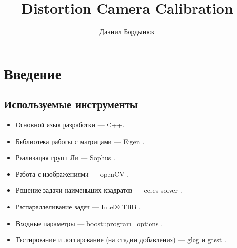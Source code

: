 


\title{Distortion Camera Calibration}
\author{Даниил Бордынюк}


\maketitle

\tableofcontents
\clearpage

\chapter*{Введение}

\section{Используемые инструменты}
\begin{itemize}
	\item Основной язык разработки --- C++.
	\item Библиотека работы с матрицами --- Eigen \cite{eigen}. 
	\item Реализация групп Ли --- Sophus \cite{sophus}.
	\item Работа с изображениями --- openCV \cite{opencv_library}.
	\item Решение задачи наименьших квадратов --- ceres-solver \cite{ceres-solver}.
	\item Распараллеливание задач --- Intel® TBB \cite{tbb}.
	\item Входные параметры --- boost::program\_options \cite{boost}.
	\item Тестирование и логгирование (на стадии добавления) --- glog \cite{glog} и gtest \cite{gtest}.
\end{itemize}

